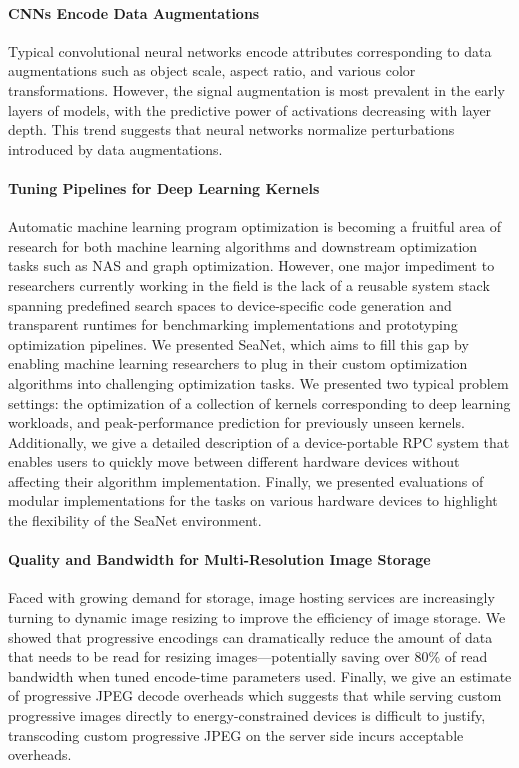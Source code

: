 \paragraph{CNNs Encode Data Augmentations}
Typical convolutional neural networks encode attributes corresponding to data augmentations such as object scale, aspect ratio, and various color transformations.
However, the signal augmentation is most prevalent in the early layers of models, with the predictive power of activations decreasing with layer depth.
This trend suggests that neural networks normalize perturbations introduced by data augmentations.

\paragraph{Tuning Pipelines for Deep Learning Kernels}
Automatic machine learning program optimization is becoming a fruitful area of research for both machine learning algorithms and downstream optimization tasks such as NAS and graph optimization.
However, one major impediment to researchers currently working in the field is the lack of a reusable system stack spanning predefined search spaces to device-specific code generation and transparent runtimes for benchmarking implementations and prototyping optimization pipelines.
We presented SeaNet, which aims to fill this gap by enabling machine learning researchers to plug in their custom optimization algorithms into challenging optimization tasks.
We presented two typical problem settings: the optimization of a collection of kernels corresponding to deep learning workloads, and peak-performance prediction for previously unseen kernels.
Additionally, we give a detailed description of a device-portable RPC system that enables users to quickly move between different hardware devices without affecting their algorithm implementation.
Finally, we presented evaluations of modular implementations for the tasks on various hardware devices to highlight the flexibility of the SeaNet environment.

\paragraph{Quality and Bandwidth for Multi-Resolution Image Storage}
Faced with growing demand for storage, image hosting services are increasingly turning to dynamic image resizing to improve the efficiency of image storage.
We showed that progressive encodings can dramatically reduce the amount of data that needs to be read for resizing images---potentially saving over 80\% of read bandwidth when tuned encode-time parameters used.
Finally, we give an estimate of progressive JPEG decode overheads which suggests that while serving custom progressive images directly to energy-constrained devices is difficult to justify, transcoding custom progressive JPEG on the server side incurs acceptable overheads.

